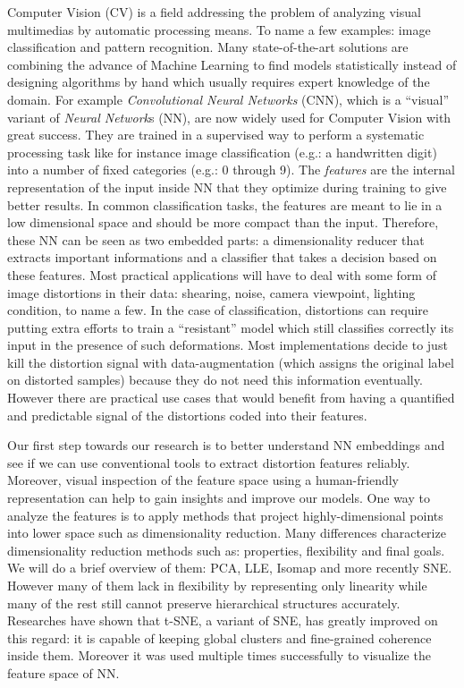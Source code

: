 \documentclass[a4paper,12pt]{report}
\newcommand{\eg}{e.g.}
\begin{document}
Computer Vision (CV) is a field addressing the problem of analyzing visual multimedias by automatic processing means.
To name a few examples: image classification and pattern recognition.
Many state-of-the-art solutions are combining the advance of Machine Learning to find models statistically instead of designing algorithms by hand which usually requires expert knowledge of the domain.
For example {\em Convolutional Neural Networks} (CNN), which is a ``visual'' variant of {\em Neural Network}s (NN), are now widely used for Computer Vision with great success\cite{krizhevsky2012imagenet}\cite{rowley1998neural}\cite{prechelt1994proben1}.
They are trained in a supervised way to perform a systematic processing task like for instance image classification (\eg: a handwritten digit) into a number of fixed categories (\eg: 0 through 9).
The {\em features} are the internal representation of the input inside NN that they optimize during training to give better results.
In common classification tasks, the features are meant to lie in a low dimensional space and should be more compact than the input.
Therefore, these NN can be seen as two embedded parts: a dimensionality reducer that extracts important informations and a classifier that takes a decision based on these features.
Most practical applications will have to deal with some form of image distortions in their data: shearing, noise, camera viewpoint, lighting condition, to name a few.
In the case of classification, distortions can require putting extra efforts to train a ``resistant'' model which still classifies correctly its input in the presence of such deformations.
Most implementations decide to just kill the distortion signal with data-augmentation (which assigns the original label on distorted samples) because they do not need this information eventually.
However there are practical use cases that would benefit from having a quantified and predictable signal of the distortions coded into their features.

Our first step towards our research is to better understand NN embeddings and see if we can use conventional tools to extract distortion features reliably.
Moreover, visual inspection of the feature space using a human-friendly representation can help to gain insights and improve our models.
One way to analyze the features is to apply methods that project highly-dimensional points into lower space such as dimensionality reduction.
Many differences characterize dimensionality reduction methods such as: properties, flexibility and final goals.
We will do a brief overview of them: PCA, LLE, Isomap and more recently SNE.
However many of them lack in flexibility by representing only linearity while many of the rest still cannot preserve hierarchical structures accurately\cite{t-SNE}.
Researches have shown that t-SNE, a variant of SNE, has greatly improved on this regard: it is capable of keeping global clusters and fine-grained coherence inside them.
Moreover it was used multiple times successfully to visualize the feature space of NN\cite{donahue2013decaf}\cite{yu2014visualizing}.
\end{document}
